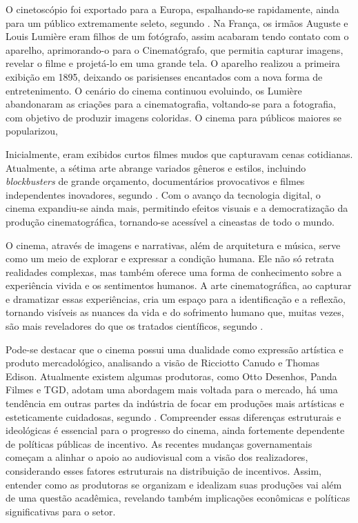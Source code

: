 \documentclass[
	article,			%
	12pt,				%
	oneside,			%
	a4paper,			%
	english,			%
	brazil,				%
	sumario=tradicional
	]{abntex2}
\begin{document}
O cinetoscópio foi exportado para a Europa, espalhando-se rapidamente, ainda para um público extremamente seleto, segundo . Na França, os irmãos Auguste e Louis Lumière eram filhos de um fotógrafo, assim acabaram tendo contato com o aparelho, aprimorando-o para o Cinematógrafo, que permitia capturar imagens, revelar o filme e projetá-lo em uma grande tela. O aparelho realizou a primeira exibição em 1895, deixando os parisienses encantados com a nova forma de entretenimento. O cenário do cinema continuou evoluindo, os Lumière abandonaram as criações para a cinematografia, voltando-se para a fotografia, com objetivo de produzir imagens coloridas. O cinema para públicos maiores se popularizou, 

Inicialmente, eram exibidos curtos filmes mudos que capturavam cenas cotidianas. Atualmente, a sétima arte abrange variados gêneros e estilos, incluindo \textit{blockbusters} de grande orçamento, documentários provocativos e filmes independentes inovadores, segundo . Com o avanço da tecnologia digital, o cinema expandiu-se ainda mais, permitindo efeitos visuais e a democratização da produção cinematográfica, tornando-se acessível a cineastas de todo o mundo.
 
O cinema, através de imagens e narrativas, além de arquitetura e música, serve como um meio de explorar e expressar a condição humana. Ele não só retrata realidades complexas, mas também oferece uma forma de conhecimento sobre a experiência vivida e os sentimentos humanos. A arte cinematográfica, ao capturar e dramatizar essas experiências, cria um espaço para a identificação e a reflexão, tornando visíveis as nuances da vida e do sofrimento humano que, muitas vezes, são mais reveladores do que os tratados científicos, segundo .
 
Pode-se destacar que o cinema possui uma dualidade como expressão artística e produto mercadológico, analisando a visão de Ricciotto Canudo e Thomas Edison. Atualmente existem algumas produtoras, como Otto Desenhos, Panda Filmes e TGD, adotam uma abordagem mais voltada para o mercado, há uma tendência em outras partes da indústria de focar em produções mais artísticas e esteticamente cuidadosas, segundo . Compreender essas diferenças estruturais e ideológicas é essencial para o progresso do cinema, ainda fortemente dependente de políticas públicas de incentivo. As recentes mudanças governamentais começam a alinhar o apoio ao audiovisual com a visão dos realizadores, considerando esses fatores estruturais na distribuição de incentivos. Assim, entender como as produtoras se organizam e idealizam suas produções vai além de uma questão acadêmica, revelando também implicações econômicas e políticas significativas para o setor.
\end{document}
